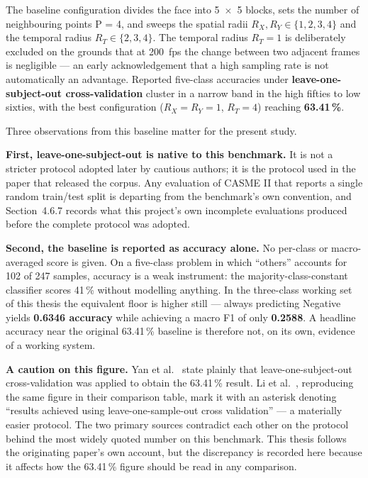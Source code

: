 The baseline configuration divides the face into 5~$\times$~5 blocks, sets the number of neighbouring points P = 4, and sweeps the spatial radii $R_X, R_Y \in \{1,2,3,4\}$ and the temporal radius $R_T \in \{2,3,4\}$. The temporal radius $R_T = 1$ is deliberately excluded on the grounds that at 200~fps the change between two adjacent frames is negligible --- an early acknowledgement that a high sampling rate is not automatically an advantage. Reported five-class accuracies under \textbf{leave-one-subject-out cross-validation} cluster in a narrow band in the high fifties to low sixties, with the best configuration ($R_X = R_Y = 1$, $R_T = 4$) reaching \textbf{63.41\,\%}.

Three observations from this baseline matter for the present study.

\textbf{First, leave-one-subject-out is native to this benchmark.} It is not a stricter protocol adopted later by cautious authors; it is the protocol used in the paper that released the corpus. Any evaluation of CASME II that reports a single random train/test split is departing from the benchmark's own convention, and Section~4.6.7 records what this project's own incomplete evaluations produced before the complete protocol was adopted.

\textbf{Second, the baseline is reported as accuracy alone.} No per-class or macro-averaged score is given. On a five-class problem in which ``others'' accounts for 102 of 247 samples, accuracy is a weak instrument: the majority-class-constant classifier scores 41\,\% without modelling anything. In the three-class working set of this thesis the equivalent floor is higher still --- always predicting Negative yields \textbf{0.6346 accuracy} while achieving a macro F1 of only \textbf{0.2588}. A headline accuracy near the original 63.41\,\% baseline is therefore not, on its own, evidence of a working system.

\textbf{A caution on this figure.} Yan et al.~\cite{yan2014} state plainly that leave-one-subject-out cross-validation was applied to obtain the 63.41\,\% result. Li et al.~\cite{liX2018}, reproducing the same figure in their comparison table, mark it with an asterisk denoting ``results achieved using leave-one-sample-out cross validation'' --- a materially easier protocol. The two primary sources contradict each other on the protocol behind the most widely quoted number on this benchmark. This thesis follows the originating paper's own account, but the discrepancy is recorded here because it affects how the 63.41\,\% figure should be read in any comparison.

